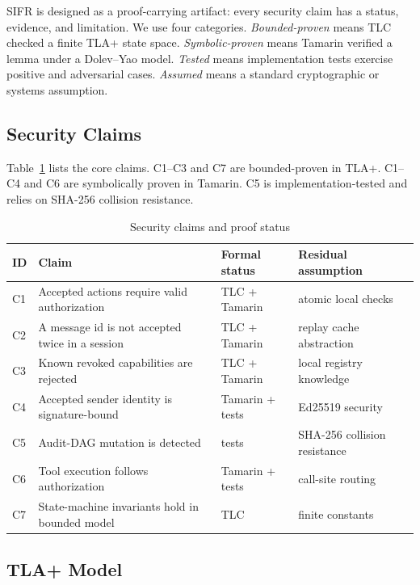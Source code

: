 \documentclass[runningheads]{llncs}
\begin{document}
SIFR is designed as a proof-carrying artifact: every security claim has a status, evidence, and limitation. We use four categories. \emph{Bounded-proven} means TLC checked a finite TLA+ state space. \emph{Symbolic-proven} means Tamarin verified a lemma under a Dolev--Yao model. \emph{Tested} means implementation tests exercise positive and adversarial cases. \emph{Assumed} means a standard cryptographic or systems assumption.

\subsection{Security Claims}

Table~\ref{tab:claims} lists the core claims. C1--C3 and C7 are bounded-proven in TLA+. C1--C4 and C6 are symbolically proven in Tamarin. C5 is implementation-tested and relies on SHA-256 collision resistance.

\begin{table}
\caption{Security claims and proof status}
\label{tab:claims}
\centering
\begin{tabular}{p{}p{}p{}p{}}
\toprule
ID & Claim & Formal status & Residual assumption \\
\midrule
C1 & Accepted actions require valid authorization & TLC + Tamarin & atomic local checks \\
C2 & A message id is not accepted twice in a session & TLC + Tamarin & replay cache abstraction \\
C3 & Known revoked capabilities are rejected & TLC + Tamarin & local registry knowledge \\
C4 & Accepted sender identity is signature-bound & Tamarin + tests & Ed25519 security \\
C5 & Audit-DAG mutation is detected & tests & SHA-256 collision resistance \\
C6 & Tool execution follows authorization & Tamarin + tests & call-site routing \\
C7 & State-machine invariants hold in bounded model & TLC & finite constants \\
\bottomrule
\end{tabular}
\end{table}

\subsection{TLA+ Model}
\end{document}
